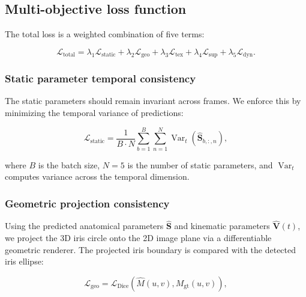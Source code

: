 \documentclass[review]{elsarticle}
\begin{document}
\subsection{Multi-objective loss function}

The total loss is a weighted combination of five terms:

\begin{equation}
\mathcal{L}_{\text{total}} = \lambda_1\mathcal{L}_{\text{static}} + \lambda_2\mathcal{L}_{\text{geo}} + \lambda_3\mathcal{L}_{\text{tex}} + \lambda_4\mathcal{L}_{\text{sup}} + \lambda_5\mathcal{L}_{\text{dyn}}.
\label{eq:total_loss}
\end{equation}

\subsubsection{Static parameter temporal consistency}

The static parameters should remain invariant across frames. We enforce this by minimizing the temporal variance of predictions:

\begin{equation}
\mathcal{L}_{\text{static}} = \frac{1}{B\cdot N}\sum_{b=1}^{B}\sum_{n=1}^{N}\operatorname{Var}_t(\hat{\mathbf{S}}_{b,:,n}),
\label{eq:static_loss}
\end{equation}

where $B$ is the batch size, $N=5$ is the number of static parameters, and $\operatorname{Var}_t$ computes variance across the temporal dimension.

\subsubsection{Geometric projection consistency}

Using the predicted anatomical parameters $\hat{\mathbf{S}}$ and kinematic parameters $\hat{\mathbf{V}}(t)$, we project the 3D iris circle onto the 2D image plane via a differentiable geometric renderer. The projected iris boundary is compared with the detected iris ellipse:

\begin{equation}
\mathcal{L}_{\text{geo}} = \mathcal{L}_{\text{Dice}}(\hat{M}(u,v), M_{\text{gt}}(u,v)),
\label{eq:geo_loss}
\end{equation}
\end{document}
